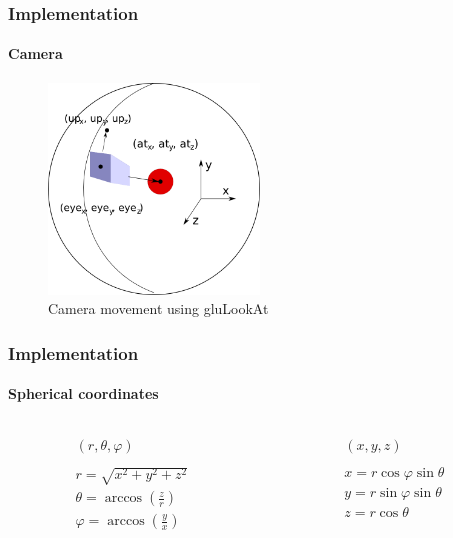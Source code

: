 \begin{frame}
    \frametitle{Implementation}
    \framesubtitle{Camera}
    \begin{figure}
        \begin{center}
           \includegraphics[width=0.5\textwidth]{img/camera} 
        \end{center}
        \caption{Camera movement using gluLookAt}
    \end{figure}
\end{frame}

\begin{frame}
    \frametitle{Implementation}
    \framesubtitle{Spherical coordinates}
    \begin{columns}
        \begin{column}{0.5\textwidth}
            \begin{eqnarray}
                (r, \theta, \varphi) \nonumber \\ \nonumber \\
                r = \sqrt{x^{2} + y^{2} + z^{2}} \nonumber\\
                \theta  = \arccos \left( \frac{z}{r}\right) \nonumber \\
                \varphi = \arccos \left( \frac{y}{x}\right) \nonumber
            \end{eqnarray}
        \end{column}
        \begin{column}{0.5\textwidth}
            \begin{eqnarray}
                (x, y, z) \nonumber \\ \nonumber \\
                x = r \cos{\varphi} \sin{\theta} \nonumber \\
                y = r \sin{\varphi} \sin{\theta} \nonumber \\
                z = r \cos{\theta}  \nonumber
            \end{eqnarray}
        \end{column}
    \end{columns}
\end{frame}
